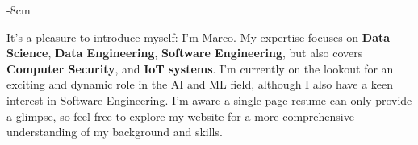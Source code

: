 \documentclass[10pt,a4paper]{altacv}
\begin{document}







\begin{adjustwidth}{}{-8cm}
\makecvheader
\end{adjustwidth}

It's a pleasure to introduce myself: I'm Marco. My expertise focuses on \textbf{Data Science}, \textbf{Data Engineering}, \textbf{Software Engineering}, but also covers \textbf{Computer Security}, and \textbf{IoT systems}. I'm currently on the lookout for an exciting and dynamic role in the AI and ML field, although I also have a keen interest in Software Engineering. I'm aware a single-page resume can only provide a glimpse, so feel free to explore my \href{https://mmarini.it}{website} for a more comprehensive understanding of my background and skills.

\end{document}
